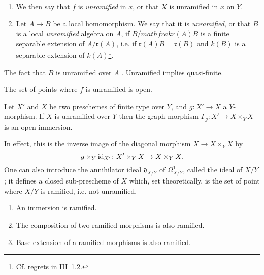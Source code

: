 \begin{defn}
    \begin{enumerate}[\normalfont(a)]
        \item We then say that $f$ is \emph{unramified} in $x$, or that $X$ is unramified in $x$ on $Y$.
        \item Let $A\to B$ be a local homomorphism.
            We say that it is \emph{unramified}, or that $B$ is a local \emph{unramified} algebra on $A$, if $B/mathfrak{r}(A)B$ is a finite separable extension of $A/\mathfrak{r}(A)$, i.e. if $\mathfrak{r}(A)B=\mathfrak{r}(B)$ and $k(B)$ is a separable extension of $k(A)$\footnote{Cf. regrets in III~1.2.}.
    \end{enumerate}
\end{defn}

\begin{rem}
    The fact that $B$ is unramified over $A$ \completelyunsure.
    Unramified implies quasi-finite.
\end{rem}

\begin{cor}
    The set of points where $f$ is unramified is open.
\end{cor}

\begin{cor}
    Let $X'$ and $X$ be two preschemes of finite type over $Y$, and $g\colon X'\to X$ a $Y$-morphism.
    If $X$ is unramified over $Y$ then the graph morphism $\Gamma_g\colon X'\to X\times_Y X$ is an open immersion.
\end{cor}

In effect, this is the inverse image of the diagonal morphism $X\to X\times_Y X$ by
\begin{equation*}
    g\times_Y \mathrm{id}_{X'}\colon X'\times_Y X\to X\times_Y X.
\end{equation*}
One can also introduce the annihilator ideal $\mathfrak{d}_{X/Y}$ of $\Omega_{X/Y}^1$, called the  ideal of $X/Y$; it defines a closed sub-prescheme of $X$ which, set theoretically, is the set of point where $X/Y$ is ramified, i.e. not unramified.

\begin{prop}
    \begin{enumerate}[\normalfont(i)]
        \item An immersion is ramified.
        \item The composition of two ramified morphisms is also ramified.
        \item Base extension of a ramified morphisms is also ramified.
    \end{enumerate}
\end{prop}

